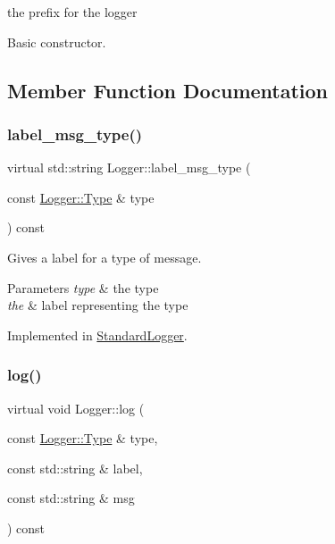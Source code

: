 the prefix for the logger 

Basic constructor. 

\subsection{Member Function Documentation}
\mbox{\label{class_logger_abe4434e4ae0efd8b41cb2a61458a710d}} 
\subsubsection{\texorpdfstring{label\_msg\_type()}{label\_msg\_type()}}
{\footnotesize\ttfamily virtual std\+::string Logger\+::label\+\_\+msg\+\_\+type (\begin{DoxyParamCaption}\item[{const \mbox{\hyperlink{class_logger_acd39cb578d7a6750c959f2fad38d8db6}{Logger\+::\+Type}} \&}]{type }\end{DoxyParamCaption}) const\hspace{0.3cm}{\ttfamily [pure virtual]}}



Gives a label for a type of message. 


\begin{DoxyParams}{Parameters}
{\em type} & the type \\
\hline
{\em the} & label representing the type \\
\hline
\end{DoxyParams}


Implemented in \mbox{\hyperlink{class_standard_logger_a5803969715008363869dfd47326790bb}{Standard\+Logger}}.

\mbox{\label{class_logger_a124934c1b2661b229aca0493f7ec5f30}} 
\subsubsection{\texorpdfstring{log()}{log()}\hspace{0.1cm}{\footnotesize\ttfamily [1/2]}}
{\footnotesize\ttfamily virtual void Logger\+::log (\begin{DoxyParamCaption}\item[{const \mbox{\hyperlink{class_logger_acd39cb578d7a6750c959f2fad38d8db6}{Logger\+::\+Type}} \&}]{type,  }\item[{const std\+::string \&}]{label,  }\item[{const std\+::string \&}]{msg }\end{DoxyParamCaption}) const\hspace{0.3cm}{\ttfamily [pure virtual]}}



